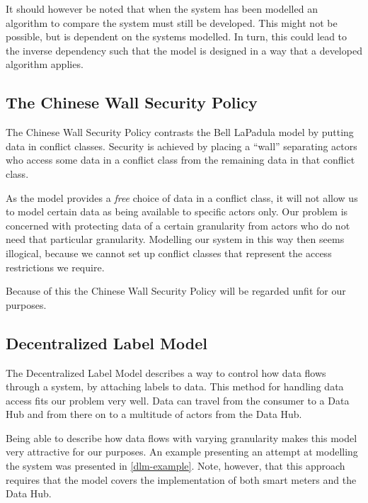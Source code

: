 It should however be noted that when the system has been modelled an algorithm to compare the system must still be developed.
This might not be possible, but is dependent on the systems modelled.
In turn, this could lead to the inverse dependency such that the model is designed in a way that a developed algorithm applies.

\subsection{The Chinese Wall Security Policy}
The Chinese Wall Security Policy contrasts the Bell LaPadula model by putting data in conflict classes.
Security is achieved by placing a ``wall'' separating actors who access some data in a conflict class from the remaining data in that conflict class.

As the model provides a \emph{free} choice of data in a conflict class, it will not allow us to model certain data as being available to specific actors only.
Our problem is concerned with protecting data of a certain granularity from actors who do not need that particular granularity.
Modelling our system in this way then seems illogical, because we cannot set up conflict classes that represent the access restrictions we require.

Because of this the Chinese Wall Security Policy will be regarded unfit for our purposes.

\subsection{Decentralized Label Model}
The Decentralized Label Model describes a way to control how data flows through a system, by attaching labels to data.
This method for handling data access fits our problem very well.
Data can travel from the consumer to a Data Hub and from there on to a multitude of actors from the Data Hub.

Being able to describe how data flows with varying granularity makes this model very attractive for our purposes.
An example presenting an attempt at modelling the system was presented in \cref{dlm-example}.
Note, however, that this approach requires that the model covers the implementation of both smart meters and the Data Hub.